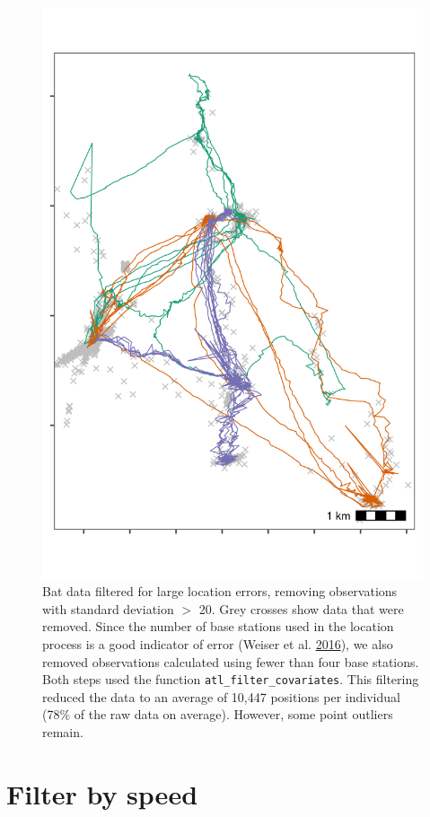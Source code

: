 \documentclass[]{scrreprt}
\begin{document}
\begin{figure}
\centering
\includegraphics{figures/fig_bat_filter_cov.png}
\caption{Bat data filtered for large location errors, removing observations with standard deviation \(>\) 20. Grey crosses show data that were removed. Since the number of base stations used in the location process is a good indicator of error (Weiser et al. \protect\hyperlink{ref-weiser2016}{2016}), we also removed observations calculated using fewer than four base stations. Both steps used the function \texttt{atl\_filter\_covariates}.
This filtering reduced the data to an average of 10,447 positions per individual (78\% of the raw data on average). However, some point outliers remain.}
\end{figure}

\hypertarget{filter-by-speed}{%
\section{Filter by speed}\label{filter-by-speed}}
\end{document}
